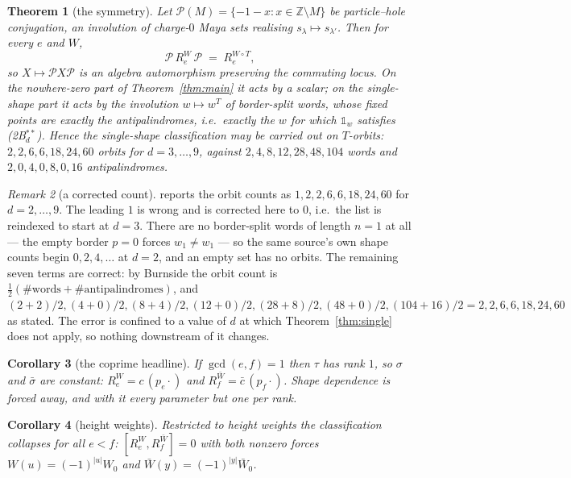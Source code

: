 \documentclass[11pt]{article}
\newtheorem{theorem}{Theorem}[section]
\newtheorem{corollary}[theorem]{Corollary}
\theoremstyle{definition}
\theoremstyle{remark}
\newtheorem{remark}[theorem]{Remark}
\newcommand{\Z}{\mathbb{Z}}
\newcommand{\PH}{\mathcal{P}}            %
\newcommand{\one}{\mathbb{1}}
\begin{document}
\begin{theorem}[the symmetry]\label{thm:symmetry}
Let $\PH(M)=\{-1-x:x\in\Z\setminus M\}$ be particle--hole conjugation, an involution of
charge-$0$ Maya sets realising $s_\lambda\mapsto s_{\lambda'}$.  Then for every $e$ and $W$,
\[
   \PH\,R_e^{W}\,\PH\;=\;R_e^{W\circ T},
\]
so $X\mapsto\PH X\PH$ is an algebra automorphism preserving the commuting locus.  On the
nowhere-zero part of Theorem~\ref{thm:main} it acts by a scalar; on the single-shape part it
acts by the involution $w\mapsto w^{T}$ of border-split words, whose fixed points are exactly
the antipalindromes, i.e.\ exactly the $w$ for which $\one_w$ satisfies
\textnormal{(2B$^{**}_d$)}.  Hence the single-shape classification may be carried out on
$T$-orbits: $2,2,6,6,18,24,60$ orbits for $d=3,\dots,9$, against
$2,4,8,12,28,48,104$ words and $2,0,4,0,8,0,16$ antipalindromes.
\end{theorem}

\begin{remark}[a corrected count]\label{rem:orbitfix}
\cite[V10]{Q151} reports the orbit counts as $1,2,2,6,6,18,24,60$ for $d=2,\dots,9$.  The
leading $1$ is wrong and is corrected here to $0$, i.e.\ the list is reindexed to start at
$d=3$.  There are no border-split words of length $n=1$ at all --- the empty border $p=0$ forces
$w_1\ne w_1$ --- so the same source's own shape counts begin $0,2,4,\dots$ at $d=2$, and an
empty set has no orbits.  The remaining seven terms are correct: by Burnside the orbit count is
$\tfrac12(\#\text{words}+\#\text{antipalindromes})$, and $(2{+}2)/2,(4{+}0)/2,(8{+}4)/2,
(12{+}0)/2,(28{+}8)/2,(48{+}0)/2,(104{+}16)/2 = 2,2,6,6,18,24,60$ as stated.  The error is
confined to a value of $d$ at which Theorem~\ref{thm:single} does not apply, so nothing
downstream of it changes.
\end{remark}

\begin{corollary}[the coprime headline]\label{cor:coprime}
If $\gcd(e,f)=1$ then $\tau$ has rank $1$, so $\sigma$ and $\bar\sigma$ are constant:
$R_e^{W}=c\,(p_e\cdot)$ and $R_f^{\bar W}=\bar c\,(p_f\cdot)$.  Shape dependence is forced
away, and with it every parameter but one per rank.
\end{corollary}

\begin{corollary}[height weights]\label{cor:height}
Restricted to height weights the classification collapses for all $e<f$: $[R_e^{W},R_f^{\bar
W}]=0$ with both nonzero forces $W(u)=(-1)^{|u|}W_0$ and $\bar W(y)=(-1)^{|y|}\bar W_0$.
\end{corollary}
\end{document}
